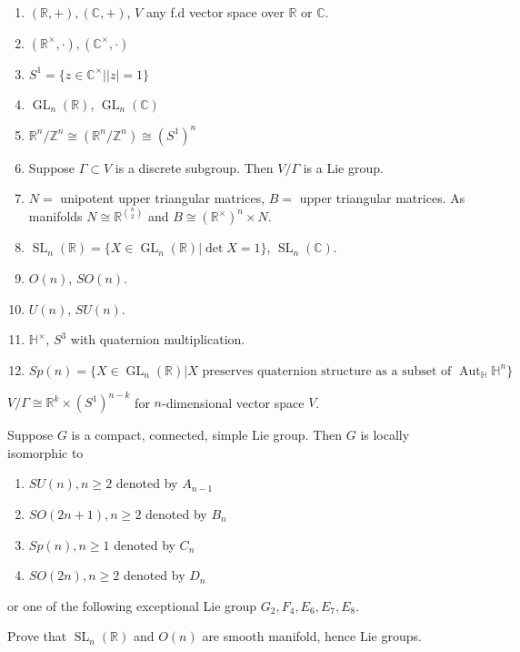 \documentclass[11pt,a4paper]{scrarticle}
\theoremstyle{definition}
\theoremstyle{greenbox}
\newcommand{\R}{\mathbb{R}}
\newcommand{\Z}{\mathbb{Z}}
\newcommand{\C}{\mathbb{C}}
\newcommand{\Ho}{\mathbb{H}}
\begin{document}
    \begin{example}
        \begin{enumerate}
            \item $ \left( \R, + \right) , (\C, +)$, $ V $ any f.d vector space over $ \R $ or $ \C $. 
            \item $ (\R^{\times}, \cdot), (\C^{\times}, \cdot) $
            \item $ S^{1} = \{ z \in \C^{\times}| |z| =1\} $
            \item $ \operatorname{GL}_{n}(\R) $, $ \operatorname{GL}_{n}(\C) $
            \item $ \R^{n} / \Z^{n} \cong \left( \R^{n} /\Z^{n} \right) \cong (S^{1})^{n}$
            \item Suppose $ \Gamma \subset V $ is a discrete subgroup. Then $ V / \Gamma  $ is a Lie group.
            \item $ N = $ unipotent upper triangular matrices, $ B =  $ upper triangular matrices. As manifolds $ N \cong \R^{\binom{n}{2}} $ and $ B \cong (\R^{\times})^{n} \times N $.
            \item $ \operatorname{SL}_{n}(\R) = \{X \in \operatorname{GL}_{n}(\R) | \det X = 1\} $, $ \operatorname{SL}_{n}(\C) $. 
            \item $ O(n) $, $ SO(n) $.
            \item $ U(n) $, $ SU(n) $.
            \item $ \Ho^{\times} $, $ S^{3}  $ with quaternion multiplication.
            \item $ Sp(n) = \{X \in \operatorname{GL}_{n}(\R)| X \text{ preserves quaternion structure as a subset of } \operatorname{Aut}_{\Ho}\Ho^{n}\} $
        \end{enumerate}
    \end{example}
    \begin{problem}
        $ V / \Gamma  \cong \R^{k} \times  (S^{1})^{n-k}$ for $ n $-dimensional vector space $  V$. 
    \end{problem}
    \begin{thm}
        Suppose $ G $ is a compact, connected, simple Lie group. Then $ G $ is locally isomorphic to \begin{enumerate}
            \item $ SU(n) , n \ge 2$ denoted by $ A_{n-1} $
            \item $ SO(2n+1), n \ge 2 $ denoted by $ B_{n} $
            \item $ Sp(n), n \ge 1 $ denoted by $ C_{n} $
            \item $ SO(2n), n\ge 2 $ denoted by $ D_{n} $
        \end{enumerate}
        or one of the following exceptional Lie group $ G_{2}, F_{4}, E_{6}, E_{7}, E_{8} $.

    \end{thm}
    \begin{problem}
        Prove that $ \operatorname{SL}_{n}(\R) $ and $ O(n) $ are smooth manifold, hence Lie groups.
    \end{problem}
\end{document}
